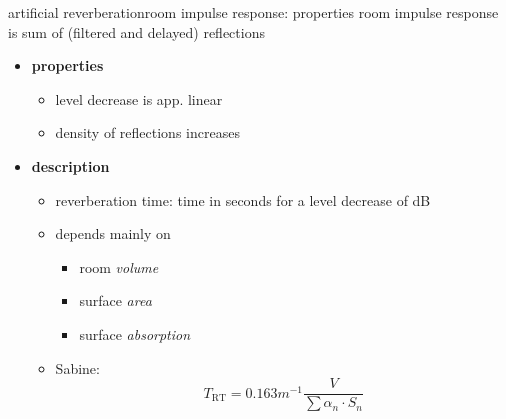 \begin{frame}{artificial reverberation}{room impulse response: properties}
	\vspace{-3mm}
    room impulse response is sum of (filtered and delayed) reflections
	\pause
	
	\begin{itemize}
		\item	\textbf{properties}
			\begin{itemize}
				\item	level decrease is app. linear
				\item	density of reflections increases
			\end{itemize}
		\pause
        \bigskip
		\item	\textbf{description}
			\begin{itemize}
				\item	reverberation time: time in seconds for a level decrease of \unit[60]{dB}
				\item	depends mainly on
					\begin{itemize}
						\item	room \textit{volume}
						\item	surface \textit{area}
						\item	surface \textit{absorption}
					\end{itemize}
				\item	Sabine:
					\begin{equation*}
						T_\mathrm{RT} = 0.163 \unit{m^{-1}} \frac{V}{\sum{\alpha_n\cdot S_n}}
					\end{equation*}
			\end{itemize}
	\end{itemize}
\end{frame}


